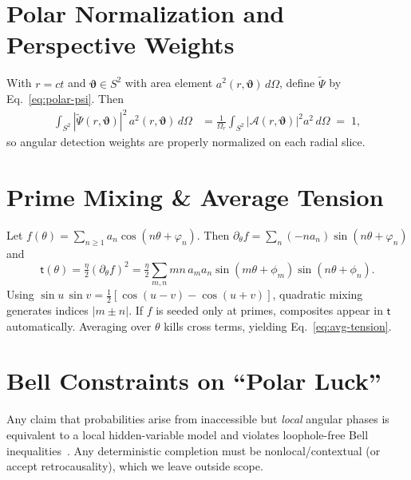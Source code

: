 \documentclass[reprint,amsmath,amssymb,aps,pra]{revtex4-2} %
\newcommand{\A}{\mathcal{A}}                   %
\newcommand{\angb}{\boldsymbol{\vartheta}}     %
\newcommand{\taufield}{\mathsf{t}}             %
\begin{document}
\appendix

\section{Polar Normalization and Perspective Weights}\label{app:polar}
With $r=ct$ and $\angb\in S^2$ with area element $a^2(r,\angb)\,d\Omega$, define $\tilde{\Psi}$ by Eq.~\eqref{eq:polar-psi}. Then
\begin{align}
 \int_{S^2} |\tilde{\Psi}(r,\angb)|^2\, a^2(r,\angb)\, d\Omega
 &= \frac{1}{\Omega_r}\int_{S^2} |\A(r,\angb)|^2 a^2\, d\Omega \;=\; 1,
\end{align}
so angular detection weights are properly normalized on each radial slice.

\section{Prime Mixing \& Average Tension}\label{app:primeproof}
  Let $f(\theta)=\sum_{n\ge1} a_n \cos{(n\theta+\varphi_n)}$. Then
  $\partial_\theta f=\sum_n (-n a_n)\sin{(n\theta+\varphi_n)}$ and
\[
    \taufield{(\theta)}=\tfrac{\eta}{2}(\partial_\theta f)^2
    = \tfrac{\eta}{2}\sum_{m,n} mn\,a_m a_n \sin{(m\theta+\phi_m)}\sin{(n\theta+\phi_n)}.
\]
  Using $\sin u\,\sin v=\tfrac{1}{2}[\cos{(u{-}v)}-\cos{(u{+}v)}]$, quadratic mixing generates indices $|m\pm n|$. If $f$ is seeded only at primes, composites appear in $\taufield$ automatically. Averaging over $\theta$ kills cross terms, yielding Eq.~\eqref{eq:avg-tension}.

\section{Bell Constraints on ``Polar Luck''}
Any claim that probabilities arise from inaccessible but \emph{local} angular phases is equivalent to a local hidden-variable model and violates loophole-free Bell inequalities~\cite{Hensen2015,Giustina2015,Shalm2015}. Any deterministic completion must be nonlocal/contextual (or accept retrocausality), which we leave outside scope.


\end{document}
